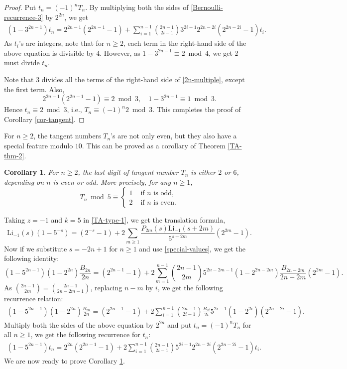 \documentclass[12pt]{amsart}
\newtheorem{cor}{Corollary}
\begin{document}
\begin{proof} 
Put $t_n=(-1)^{n}T_n$. By multiplying both the sides of \eqref{Bernoulli-recurrence-3} by $2^{2n}$, we get
\begin{align}\label{2n-multiple}
(1-3^{2n-1})t_n= 2^{2n-1}(2^{2n-1}-1) +\sum_{i=1}^{n-1}\binom{2n-1}{2i-1}3^{2i-1}2^{2n-2i}(2^{2n-2i}-1)t_i.
\end{align}
As $t_i$'s are integers, note that for $n\geq 2$, each term in the right-hand side of the above equation is divisible by $4$.
However, as $1-3^{2n-1} \equiv 2 \bmod{4}$, we get 2 must divide $t_n$.

Note that $3$ divides all  the terms of the right-hand side of \eqref{2n-multiple}, except the first term. Also,
$$
2^{2n-1}(2^{2n-1}-1)  \equiv 2 \bmod{3}, \quad 1-3^{2n-1}  \equiv 1 \bmod{3}.
$$
Hence $t_n \equiv 2 \bmod{3}$, i.e.,  $T_n \equiv (-1)^n2 \bmod{3}$. This completes the proof of Corollary \ref{cor-tangent}.
\end{proof}

For $n \ge 2$, the tangent numbers $T_n$'s are not only even, but they also have a special feature modulo $10$.
This can be proved as a corollary of Theorem \ref{TA-thm-2}.

\begin{cor}\label{mod-5}
For $n\geq 2$, the last digit of tangent number $T_n$ is either $2$ or $6$, depending on $n$ is even or odd. More precisely,
for any $n \ge 1$,
$$
  T_n \bmod{5}\equiv
  \begin{cases}
   1   &  \text{ if  } n  \text{ is odd},\\
   2  & \text{ if } n  \text{ is even}.
  \end{cases}
  $$
\end{cor}

Taking $z=-1$ and $k=5$ in \eqref{TA-type-1}, we get the translation formula,
$$
\mathrm{Li}_{-1}(s)(1-5^{-s})=(2^{-s}-1)+2\sum_{m\geq 1}\frac{P_{2m}(s)\mathrm{Li}_{-1}(s+2m)}{5^{s+2m}}(2^{2m}-1).
$$
Now if we substitute $s=-2n+1$
for $n\geq 1$ and use \eqref{special-values}, we get the following identity:
$$
(1-5^{2n-1})(1-2^{2n})\frac{B_{2n}}{2n}=(2^{2n-1}-1)+2\sum_{m=1}^{n-1}\binom{2n-1}{2m}{5^{2n-2m-1}}(1-2^{2n-2m})\frac{B_{2n-2m}}{2n-2m}(2^{2m}-1).
$$
As $\binom{2n-1}{2m}=\binom{2n-1}{2n-2m-1}$, replacing $n-m$ by $i$, we get the following recurrence relation:
\begin{align*}
(1-5^{2n-1})(1-2^{2n})\frac{B_{2n}}{2n}=(2^{2n-1}-1)+2\sum_{i=1}^{n-1}\binom{2n-1}{2i-1}\frac{B_{2i}}{2i}{5^{2i-1}}(1-2^{2i})(2^{2n-2i}-1).
\end{align*}
Multiply both the sides of the above equation by $2^{2n}$ and put $t_n=(-1)^{n}T_n$ for all $n\geq 1$, we get the following recurrence for $t_n$:
\begin{align}\label{k=5}
(1-5^{2n-1})t_n=2^{2n}(2^{2n-1}-1)+2\sum_{i=1}^{n-1}\binom{2n-1}{2i-1}{5^{2i-1}}2^{2n-2i}(2^{2n-2i}-1)t_i.
\end{align}
We are now ready to prove Corollary \ref{mod-5}.
\end{document}
